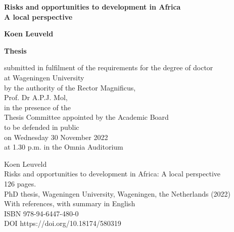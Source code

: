\begin{titlepage}
   \begin{center}
       \vspace*{1cm}

       \Huge
       \textbf{Risks and opportunities to development in Africa \\ \LARGE A local perspective}

       \vspace*{60pt}

       \large  
       \textbf{Koen Leuveld}

      \vfill

      \normalsize
      \textbf{Thesis}

      submitted in fulfilment of the requirements for the degree of doctor \\
      at Wageningen University \\
      by the authority of the Rector Magnificus, \\
      Prof. Dr A.P.J. Mol, \\
      in the presence of the \\
      Thesis Committee appointed by the Academic Board \\
      to be defended in public \\
      on Wednesday 30 November 2022 \\
      at 1.30 p.m. in the Omnia Auditorium
      \vspace{0.8cm}


         
   \end{center}
\end{titlepage}


\begin{titlepage}
   \vspace*{1cm}
   \vspace*{\fill}

   \noindent
   Koen Leuveld \\
   Risks and opportunities to development in Africa: A local perspective \\
   126 pages. \\

   \noindent
   PhD thesis, Wageningen University, Wageningen, the Netherlands (2022) \\
   With references, with summary in English \\

   \noindent
   ISBN 978-94-6447-480-0  \\
   DOI https://doi.org/10.18174/580319 \\
   \vspace{0.8cm}
\end{titlepage}

\hypersetup{pageanchor=true}
\doublespacing

